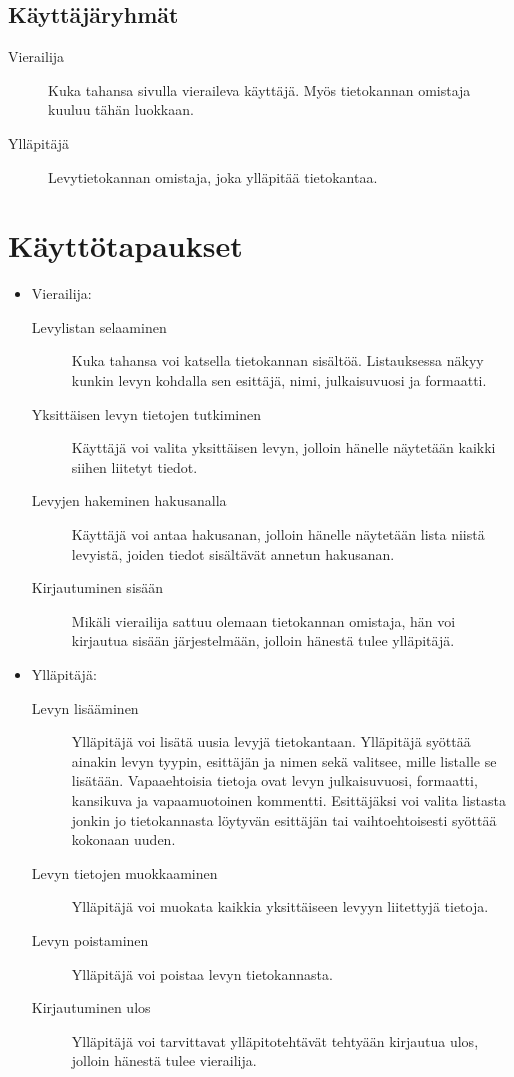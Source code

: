 \documentclass[a4paper,12pt]{report}
\begin{document}
\subsection{Käyttäjäryhmät}
\begin{description}
\item[Vierailija] Kuka tahansa sivulla vieraileva käyttäjä. Myös tietokannan
omistaja kuuluu tähän luokkaan.
\item[Ylläpitäjä] Levytietokannan omistaja,
joka ylläpitää tietokantaa.
\end{description}

\section{Käyttötapaukset}

\begin{itemize}

\item Vierailija:
\begin{description}
\item[Levylistan selaaminen] Kuka tahansa voi katsella tietokannan sisältöä.
Listauksessa näkyy kunkin levyn kohdalla sen esittäjä, nimi, julkaisuvuosi ja
formaatti.
\item[Yksittäisen levyn tietojen tutkiminen] Käyttäjä voi valita yksittäisen
levyn, jolloin hänelle näytetään kaikki siihen liitetyt tiedot.
\item[Levyjen hakeminen hakusanalla] Käyttäjä voi antaa hakusanan, jolloin
hänelle näytetään lista niistä levyistä, joiden tiedot sisältävät annetun
hakusanan.
\item[Kirjautuminen sisään] Mikäli vierailija sattuu olemaan tietokannan
omistaja, hän voi kirjautua sisään järjestelmään, jolloin hänestä tulee
ylläpitäjä.
\end{description}

\item Ylläpitäjä:
\begin{description}
\item[Levyn lisääminen] Ylläpitäjä voi lisätä uusia levyjä tietokantaan.
Ylläpitäjä syöttää ainakin levyn tyypin, esittäjän ja nimen sekä valitsee, mille
listalle se lisätään. Vapaaehtoisia tietoja ovat levyn julkaisuvuosi, formaatti,
kansikuva ja vapaamuotoinen kommentti. Esittäjäksi voi valita listasta jonkin jo
tietokannasta löytyvän esittäjän tai vaihtoehtoisesti syöttää kokonaan uuden.
\item[Levyn tietojen muokkaaminen] Ylläpitäjä voi muokata kaikkia yksittäiseen
levyyn liitettyjä tietoja.
\item[Levyn poistaminen] Ylläpitäjä voi poistaa levyn tietokannasta.
\item[Kirjautuminen ulos] Ylläpitäjä voi tarvittavat ylläpitotehtävät tehtyään
kirjautua ulos, jolloin hänestä tulee vierailija.
\end{description}

\end{itemize}
\end{document}
